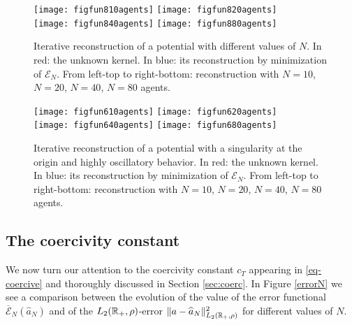 \begin{figure}[h!]
\begin{center}
\texttt{[image: figfun810agents]}
\texttt{[image: figfun820agents]}\\
\texttt{[image: figfun840agents]}
\texttt{[image: figfun880agents]}
\end{center}
\caption{Iterative reconstruction of a potential with different values of $N$. In red: the unknown kernel. In blue: its reconstruction by minimization of $\mathcal{E}_N$. From left-top to right-bottom: reconstruction with $N = 10$, $N = 20$, $N = 40$, $N = 80$ agents.}\label{variableN}
\end{figure}

\begin{figure}[h!]
\begin{center}
\texttt{[image: figfun610agents]}
\texttt{[image: figfun620agents]}\\
\texttt{[image: figfun640agents]}
\texttt{[image: figfun680agents]}
\end{center}
\caption{Iterative reconstruction of a potential with a singularity at the origin and highly oscillatory behavior. In red: the unknown kernel. In blue: its reconstruction by minimization of $\mathcal{E}_N$. From left-top to right-bottom: reconstruction with $N = 10$, $N = 20$, $N = 40$, $N = 80$ agents.}\label{variableN2}
\end{figure}

\subsection{The coercivity constant}

We now turn our attention to the coercivity constant $c_T$ appearing in \eqref{eq-coercive} and thoroughly discussed in Section \ref{sec:coerc}. In Figure \ref{errorN} we see a comparison between the evolution of the value of the error functional $\overline{\mathcal{E}}_N(\widehat{a}_N)$ and of the $L_2(\mathbb{R}_+,\rho)$-error $\|a-\widehat{a}_N\|^2_{L_2(\mathbb{R}_+,\rho)}$ for different values of $N$. 

